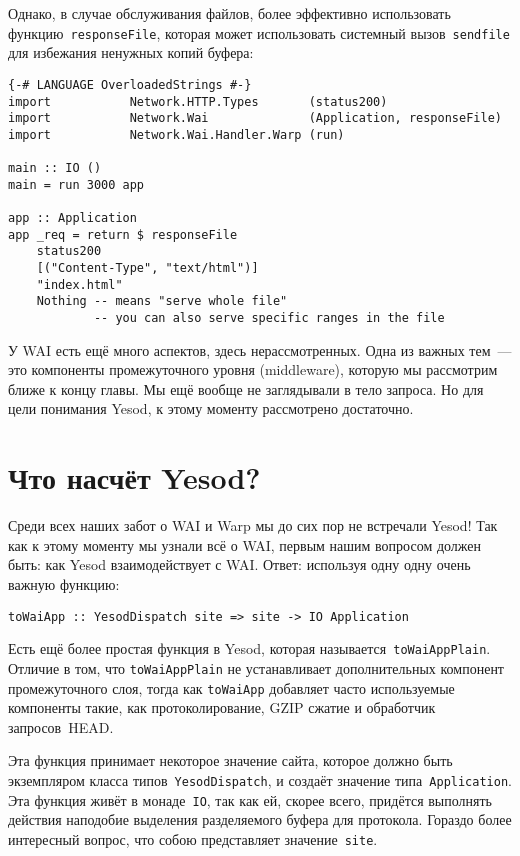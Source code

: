 Однако, в случае обслуживания файлов, более эффективно использовать
функцию~\lstinline'responseFile', которая может использовать системный
вызов~\lstinline'sendfile' для избежания ненужных копий буфера:
\begin{lstlisting}
{-# LANGUAGE OverloadedStrings #-}
import           Network.HTTP.Types       (status200)
import           Network.Wai              (Application, responseFile)
import           Network.Wai.Handler.Warp (run)

main :: IO ()
main = run 3000 app

app :: Application
app _req = return $ responseFile
    status200
    [("Content-Type", "text/html")]
    "index.html"
    Nothing -- means "serve whole file"
            -- you can also serve specific ranges in the file
\end{lstlisting}

У WAI есть ещё много аспектов, здесь нерассмотренных. Одна из важных тем~---
это компоненты промежуточного уровня (middleware), которую мы рассмотрим ближе
к концу главы. Мы ещё вообще не заглядывали в тело запроса. Но для цели
понимания Yesod, к этому моменту рассмотрено достаточно.

\section{Что насчёт Yesod?}
Среди всех наших забот о WAI и Warp мы до сих пор не встречали Yesod! Так как к
этому моменту мы узнали всё о WAI, первым нашим вопросом должен быть: как Yesod
взаимодействует с WAI. Ответ: используя одну одну очень важную функцию:
\begin{lstlisting}
toWaiApp :: YesodDispatch site => site -> IO Application
\end{lstlisting}

\begin{remark}
    Есть ещё более простая функция в Yesod, которая
    называется~\lstinline'toWaiAppPlain'. Отличие в том, что
    \lstinline'toWaiAppPlain' не устанавливает дополнительных компонент
    промежуточного слоя, тогда как \lstinline'toWaiApp' добавляет часто
    используемые компоненты такие, как протоколирование, GZIP сжатие и
    обработчик запросов~HEAD.
\end{remark}

Эта функция принимает некоторое значение сайта, которое должно быть
экземпляром класса типов~\lstinline'YesodDispatch', и создаёт значение
типа~\lstinline'Application'. Эта функция живёт в монаде~\lstinline'IO', так
как ей, скорее всего, придётся выполнять действия наподобие выделения
разделяемого буфера для протокола. Гораздо более интересный вопрос, что собою
представляет значение~\lstinline'site'.

